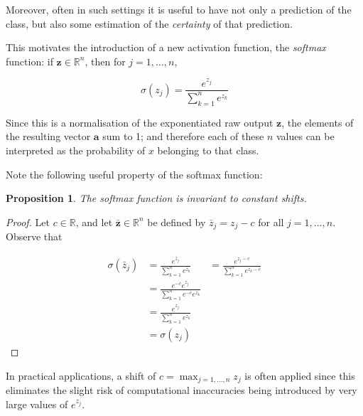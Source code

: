 \documentclass{article}[11pt]
\newtheorem{proposition}{Proposition}
\begin{document}
        Moreover, often in such settings it is useful to have not only a prediction of the class, but also some estimation of the \textit{certainty} of that prediction.
        
        This motivates the introduction of a new activation function, the \textit{softmax} function: if $\mathbf{z} \in \mathbb{R}^n$, then for $j = 1, \ldots, n$,
        
        $$
        \sigma(z_j) = \frac{e^{z_j}}{\sum_{k=1}^{n} e^{z_k}}
        $$
        
        Since this is a normalisation of the exponentiated raw output $\mathbf{z}$, the elements of the resulting vector $\mathbf{a}$ sum to 1; and therefore each of these $n$ values can be interpreted as the probability of $x$ belonging to that class.
        
        Note the following useful property of the softmax function: 
        
        \begin{proposition}
            
            The softmax function is invariant to constant shifts.
            
        \end{proposition}
    
        \begin{proof}
            
            Let $c \in \mathbb{R}$, and let $\mathbf{\bar{z}} \in \mathbb{R}^n$ be defined by $\bar{z}_j = z_j - c$ for all $j = 1, \ldots, n$. Observe that
            
            $$ \begin{aligned}
                \sigma(\bar{z}_j)
                &= \frac{e^{\bar{z}_j}}{\sum_{k=1}^{n} e^{\bar{z}_k}}
                &= \frac{e^{z_j - c}}{\sum_{k=1}^{n} e^{z_k - c}} \\
                &= \frac{e^{-c} e^{z_j}}{\sum_{k=1}^{n} e^{-c} e^{z_k}} \\
                &= \frac{e^{z_j}}{\sum_{k=1}^{n} e^{z_k}} \\
                &= \sigma(z_j)
            \end{aligned} $$
            
        \end{proof}
        
        In practical applications, a shift of $c = \max_{j = 1, \ldots, n} z_j$ is often applied since this eliminates the slight risk of computational inaccuracies being introduced by very large values of $e^{z_j}$.
        
\end{document}
